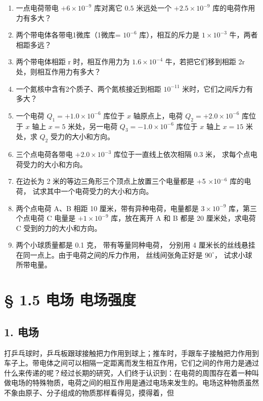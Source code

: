 \begin{enumerate}
\def\labelenumi{\arabic{enumi}.}
\item
  一点电荷带电 \(+6 \times 10^{-9}\) 库对离它 \(0.5\) 米远处一个
  \(+2.5 \times 10^{-9}\) 库的电荷作用力有多大？
\item
  两个带电体各带电1微库（1微库= \(10^{-6}\) 库），相互的斥力是
  \(1\times10^{-3}\) 牛，两者相距多远？
\item
  两个带电体相距 r 时，相互作用力为 \(1.6 \times 10^{-4}\)
  牛，若把它们移到相距 2r 处，则相互作用力有多大？
\item
  一个氮核中含有2个质子、两个氮核接近到相距 \(10^{-11}\)
  米时，它们之间斥力有多大？
\item
  一个电荷 \(Q_{1} = +1.0 \times 10^{-6}\) 库位于 \(x\) 轴原点上，电荷
  \(Q_{2} = +2.0 \times 10^{-6}\) 库位于 \(x\) 轴上 \(x = 5\)
  米处，另一电荷 \(Q_{3} = -1.0 \times 10^{-6}\) 库位于 \(x\) 轴上
  \(x = 15\) 米处，求 \(Q_{2}\) 受力的大小和方向。
\item
  三个点电荷各带电 \(+2.0 \times 10^{-3}\) 库位于一直线上依次相隔 0.3
  米， 求每个点电荷受力的大小和方向。
\item
  在边长为 2 米的等边三角形三个顶点上放置三个电量都是 +5 ×10\(^{-6}\)
  库的电荷， 试求其中一个电荷受力的大小和方向。
\item
  两个点电荷 A、B 相距 10 厘米，带有异种电荷，电量都是
  \(3 \times 10^{-9}\) 库，第三个点电荷 C 电量是 \(+1 \times 10^{-9}\)
  库，放在离开 A 和 B 都是 20 厘米处，求电荷 C 受到的力的大小和方向。
\item
  两个小球质量都是 0.1 克， 带有等量同种电荷， 分别用 4
  厘米长的丝线悬挂在同一点上。由于电荷之间的斥力作用， 丝线间张角正好是
  \(90^{\circ}\)， 试求小球所带电量。
\end{enumerate}

\section{§ 1.5 电场
电场强度}\label{ux7535ux573a-ux7535ux573aux5f3aux5ea6}

\subsection{1. 电场}\label{ux7535ux573a}

打乒乓球时，乒乓板跟球接触把力作用到球上；推车时，手跟车子接触把力作用到车子上。带电体之间可以相隔一定距离而发生相互作用，它们之间的作用力是通过什么来传递的呢？经过长期的研究，人们终于认识到：在电荷的周围存在着一种叫做电场的特殊物质，电荷之间的相互作用是通过电场来发生的。电场这种物质虽然不象由原子、分子组成的物质那样看得见，摸得着，但

